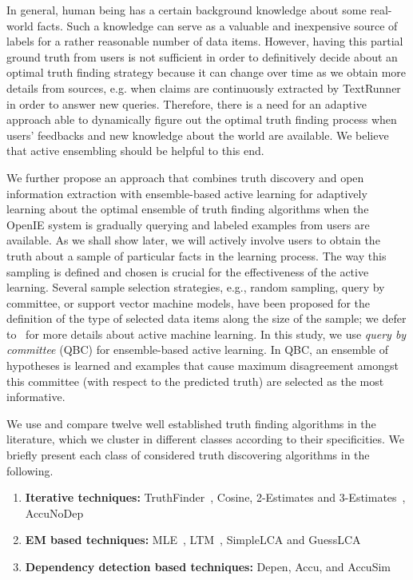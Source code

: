In general, human being has a certain background knowledge about some real-world facts. Such a knowledge can serve as a valuable and inexpensive source of labels for a 
rather reasonable number of data items. However, having this partial ground truth from users is not sufficient in order to definitively decide about an optimal truth
finding strategy because it can change over time as we obtain more details from sources, e.g. when claims are continuously extracted by TextRunner in order to answer new 
queries. Therefore, there is a need for an adaptive approach able to dynamically figure out the optimal truth finding process when users' feedbacks and new knowledge about 
the world are available. We believe that active ensembling should be helpful to this end.

We further propose an approach that combines truth discovery and open information extraction with ensemble-based active learning for adaptively learning about the optimal 
ensemble of truth finding algorithms when the OpenIE system is gradually querying and labeled examples from users are available.
As we shall show later, we will actively involve users to obtain the truth about a sample of particular facts in the learning process. The way this sampling is defined and
chosen is crucial for the effectiveness of the active learning. Several sample selection strategies, e.g., random sampling, query by committee, or support vector machine models,
have been proposed for the definition of the type of selected data items along the size of the sample; we defer to~\cite{burr12} for more details about active machine learning.
In this study, we use \emph{query by committee} (QBC) for ensemble-based active learning. In QBC, an ensemble of hypotheses is learned and examples that cause maximum disagreement amongst this committee (with respect to the predicted truth) are selected as the 
most informative. 


We use and compare twelve well established truth finding algorithms in the literature,
which we cluster in different classes according to their specificities.
We briefly present each class of considered truth discovering algorithms in the following.

\begin{enumerate}
 \item \textbf{Iterative techniques:} TruthFinder~\cite{YinHY08}, Cosine, 2-Estimates and 3-Estimates~\cite{GallandAMS10}, 
 AccuNoDep~\cite{DongBS09}
 \item \textbf{EM based techniques:} MLE~\cite{WangKLA12}, LTM~\cite{ZhaoRGH12}, SimpleLCA and GuessLCA~\cite{PasternackR13}
 \item \textbf{Dependency detection based techniques:} Depen, Accu, and AccuSim~\cite{DongBS09}
\end{enumerate}

